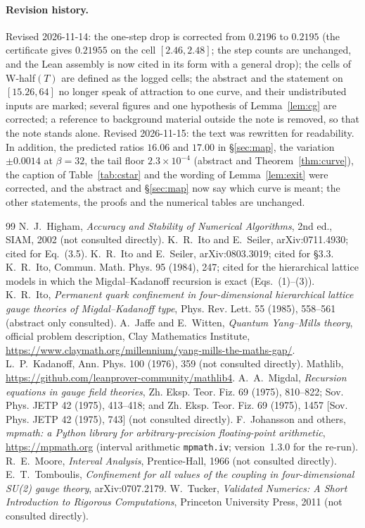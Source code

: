 \documentclass[11pt,a4paper]{article}
\theoremstyle{definition}
\theoremstyle{remark}
\newcommand{\code}[1]{\texttt{#1}}
\begin{document}
\paragraph{Revision history.} Revised 2026-11-14: the one-step drop is corrected from $0.2196$ to $0.2195$ (the certificate gives $0.21955$ on the cell $[2.46,2.48]$; the step counts are unchanged, and the Lean assembly is now cited in its form with a general drop); the cells of W-half$(T)$ are defined as the logged cells; the abstract and the statement on $[15.26,64]$ no longer speak of attraction to one curve, and their undistributed inputs are marked; several figures and one hypothesis of Lemma~\ref{lem:cg} are corrected; a reference to background material outside the note is removed, so that the note stands alone. Revised 2026-11-15: the text was rewritten for readability. In addition, the predicted ratios $16.06$ and $17.00$ in \S\ref{sec:map}, the variation $\pm0.0014$ at $\beta=32$, the tail floor $2.3\times10^{-4}$ (abstract and Theorem~\ref{thm:curve}), the caption of Table~\ref{tab:cstar} and the wording of Lemma~\ref{lem:exit} were corrected, and the abstract and \S\ref{sec:map} now say which curve is meant; the other statements, the proofs and the numerical tables are unchanged.

\begin{thebibliography}{99}
 N.~J.~Higham, \emph{Accuracy and Stability of Numerical Algorithms}, 2nd ed., SIAM, 2002 (not consulted directly).
 K.~R.~Ito and E.~Seiler, arXiv:0711.4930; cited for Eq.~(3.5).
 K.~R.~Ito and E.~Seiler, arXiv:0803.3019; cited for \S3.3.
 K.~R.~Ito, Commun. Math. Phys. 95 (1984), 247; cited for the hierarchical lattice models in which the Migdal--Kadanoff recursion is exact (Eqs.~(1)--(3)).
 K.~R.~Ito, \emph{Permanent quark confinement in four-dimensional hierarchical lattice gauge theories of Migdal--Kadanoff type}, Phys. Rev. Lett. 55 (1985), 558--561 (abstract only consulted).
 A.~Jaffe and E.~Witten, \emph{Quantum Yang--Mills theory}, official problem description, Clay Mathematics Institute, \url{https://www.claymath.org/millennium/yang-mills-the-maths-gap/}.
 L.~P.~Kadanoff, Ann. Phys. 100 (1976), 359 (not consulted directly).
 Mathlib, \url{https://github.com/leanprover-community/mathlib4}.
 A.~A.~Migdal, \emph{Recursion equations in gauge field theories}, Zh. Eksp. Teor. Fiz. 69 (1975), 810--822; Sov. Phys. JETP 42 (1975), 413--418; and Zh. Eksp. Teor. Fiz. 69 (1975), 1457 [Sov. Phys. JETP 42 (1975), 743] (not consulted directly).
 F.~Johansson and others, \emph{mpmath: a Python library for arbitrary-precision floating-point arithmetic}, \url{https://mpmath.org} (interval arithmetic \code{mpmath.iv}; version~1.3.0 for the re-run).
 R.~E.~Moore, \emph{Interval Analysis}, Prentice-Hall, 1966 (not consulted directly).
 E.~T.~Tomboulis, \emph{Confinement for all values of the coupling in four-dimensional SU(2) gauge theory}, arXiv:0707.2179.
 W.~Tucker, \emph{Validated Numerics: A Short Introduction to Rigorous Computations}, Princeton University Press, 2011 (not consulted directly).
\end{thebibliography}
\end{document}
